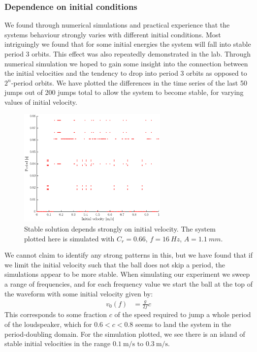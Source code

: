 \documentclass[12pt,oneside,a4paper]{article}
\numberwithin{equation}{section}
\begin{document}
{{{{\subsubsection{Dependence on initial conditions}
We found through numerical simulations and practical experience that the systems behaviour strongly varies with different initial conditions. Most intriguingly we found that for some initial energies the system will fall into stable period 3 orbits. This effect was also repeatedly demonstrated in the lab. Through numerical simulation we hoped to gain some insight into the connection between the initial velocities and the tendency to drop into period 3 orbits as opposed to $2^n$-period orbits. We have plotted the differences in the time series of the last 50 jumps out of 200 jumps total to allow the system to become stable, for varying values of initial velocity. 
\begin{figure}[h]
\centering
\includegraphics[width=0.65\textwidth]{vsweep.eps}
\caption{Stable solution depends strongly on initial velocity. The system plotted here is simulated with $C_r=0.66$, $f=\SI{16}{Hz}$, $A=\SI{1.1}{mm}$.}
\end{figure}
We cannot claim to identify any strong patterns in this, but we have found that if we limit the initial velocity such that the ball does not skip a period, the simulations appear to be more stable. When simulating our experiment we sweep a range of frequencies, and for each frequency value we start the ball at the top of the waveform with some initial velocity given by:
\begin{align*}
v_0(f) &= \frac{g}{2f} c
\end{align*}
This corresponds to some fraction $c$ of the speed required to jump a whole period of the loudspeaker, which for $0.6<c<0.8$ seems to land the system in the period-doubling domain. For the simulation plotted, we see there is an island of stable initial velocities in the range $\SI{0.1}{\meter\per\second}$ to $\SI{0.3}{\meter\per\second}$.
}}}}
\end{document}
